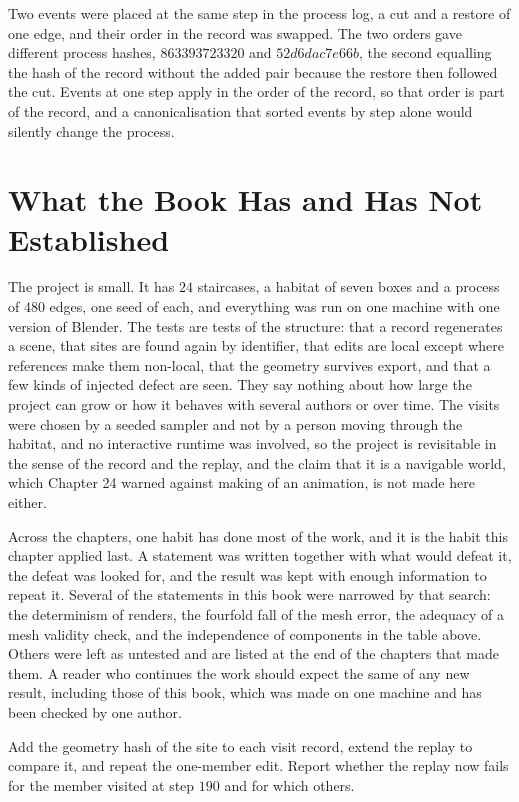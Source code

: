 Two events were placed at the same step in the process log, a cut and a restore of one edge, and their order in the record was swapped. The two orders gave different process hashes, $863393723320$ and $52d6dac7e66b$, the second equalling the hash of the record without the added pair because the restore then followed the cut. Events at one step apply in the order of the record, so that order is part of the record, and a canonicalisation that sorted events by step alone would silently change the process.

\section{What the Book Has and Has Not Established}

The project is small. It has $24$ staircases, a habitat of seven boxes and a process of $480$ edges, one seed of each, and everything was run on one machine with one version of Blender. The tests are tests of the structure: that a record regenerates a scene, that sites are found again by identifier, that edits are local except where references make them non-local, that the geometry survives export, and that a few kinds of injected defect are seen. They say nothing about how large the project can grow or how it behaves with several authors or over time. The visits were chosen by a seeded sampler and not by a person moving through the habitat, and no interactive runtime was involved, so the project is revisitable in the sense of the record and the replay, and the claim that it is a navigable world, which Chapter 24 warned against making of an animation, is not made here either.

Across the chapters, one habit has done most of the work, and it is the habit this chapter applied last. A statement was written together with what would defeat it, the defeat was looked for, and the result was kept with enough information to repeat it. Several of the statements in this book were narrowed by that search: the determinism of renders, the fourfold fall of the mesh error, the adequacy of a mesh validity check, and the independence of components in the table above. Others were left as untested and are listed at the end of the chapters that made them. A reader who continues the work should expect the same of any new result, including those of this book, which was made on one machine and has been checked by one author.

\begin{exercise}
Add the geometry hash of the site to each visit record, extend the replay to compare it, and repeat the one-member edit. Report whether the replay now fails for the member visited at step $190$ and for which others.
\end{exercise}

